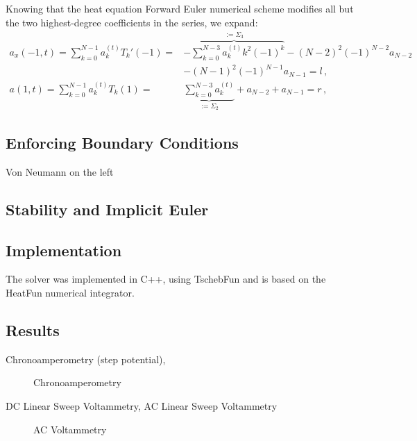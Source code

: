 \documentclass{prettytex/ox/mmsc-special-topic}
\begin{document}
  Knowing that the heat equation Forward Euler numerical scheme modifies all but the two highest-degree coefficients in the series, we expand:
  \begin{align*}
    a_x(-1, t) = \sum_{k=0}^{N-1} a_k^{(t)} T_k'(-1) =   & \overbrace{-\sum_{k=0}^{N-3} a_k^{(t)} k^2 (-1)^{k}}^{:= \Sigma_3} - (N-2)^2 (-1)^{N-2} a_{N-2}                  \\
                                                         & -(N-1)^2 (-1)^{N-1} a_{N-1} = l\,,                                                                               \\
    a(1, t)    = \sum_{k=0}^{N-1} a_k^{(t)} T_k(1)     = & \underbrace{\sum_{k=0}^{N-3} a_k^{(t)}}_{:= \Sigma_2}              + a_{N-2}                    + a_{N-1} = r\,,
  \end{align*}

  \subsection{Enforcing Boundary Conditions}
  Von Neumann on the left

  \subsection{Stability and Implicit Euler}

  \subsection{Implementation}
  The solver was implemented in C++, using TschebFun and is based on the HeatFun numerical integrator.


  \subsection{Results}
  Chronoamperometry (step potential),

  \begin{figure}[H]
    \centering
    \caption{Chronoamperometry}
    \label{fig:chronoamperometry}
  \end{figure}

  DC Linear Sweep Voltammetry,
  AC Linear Sweep Voltammetry

  \begin{figure}[H]
    \centering
    \caption{AC Voltammetry}
    \label{fig:ac-voltammetry}
  \end{figure}
\end{document}
